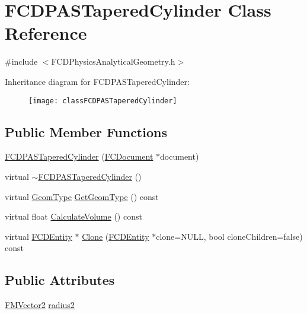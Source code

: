 \hypertarget{classFCDPASTaperedCylinder}{
\section{FCDPASTaperedCylinder Class Reference}
\label{classFCDPASTaperedCylinder}
}


{\ttfamily \#include $<$FCDPhysicsAnalyticalGeometry.h$>$}

Inheritance diagram for FCDPASTaperedCylinder:\begin{figure}[H]
\begin{center}
\leavevmode
\texttt{[image: classFCDPASTaperedCylinder]}
\end{center}
\end{figure}
\subsection*{Public Member Functions}
\begin{DoxyCompactItemize}
\item 
\hyperlink{classFCDPASTaperedCylinder_aad8939ae0fd46c84c1f869e6edd450cf}{FCDPASTaperedCylinder} (\hyperlink{classFCDocument}{FCDocument} $\ast$document)
\item 
virtual \hyperlink{classFCDPASTaperedCylinder_afe1df9fc946b28cd7bfcf8c1412f49f9}{$\sim$FCDPASTaperedCylinder} ()
\item 
virtual \hyperlink{classFCDPhysicsAnalyticalGeometry_a511583406e5c6a1bb5bd84c0453a452c}{GeomType} \hyperlink{classFCDPASTaperedCylinder_a0f25b9a117356a6e18e8e29c1c705b4e}{GetGeomType} () const 
\item 
virtual float \hyperlink{classFCDPASTaperedCylinder_a50a96833458500497aa343d1bf3f92e5}{CalculateVolume} () const 
\item 
virtual \hyperlink{classFCDEntity}{FCDEntity} $\ast$ \hyperlink{classFCDPASTaperedCylinder_a34397b0765bebf5dcf08a61585ece3f0}{Clone} (\hyperlink{classFCDEntity}{FCDEntity} $\ast$clone=NULL, bool cloneChildren=false) const 
\end{DoxyCompactItemize}
\subsection*{Public Attributes}
\begin{DoxyCompactItemize}
\item 
\hyperlink{classFMVector2}{FMVector2} \hyperlink{classFCDPASTaperedCylinder_a57e844efb895854e8f69b214d39ddc7a}{radius2}
\end{DoxyCompactItemize}


